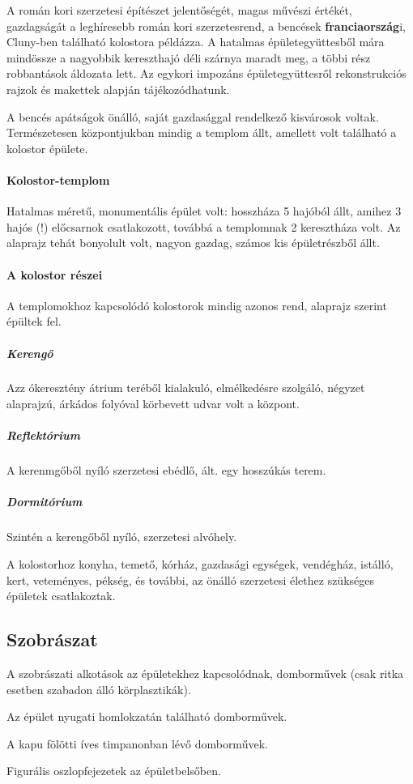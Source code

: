	A román kori szerzetesi építészet jelentőségét, magas művészi értékét, gazdagságát a leghíresebb román kori szerzetesrend, a bencések \textbf{franciaország}i, Cluny-ben található kolostora példázza. A hatalmas épületegyüttesből mára mindössze a nagyobbik kereszthajó déli szárnya maradt meg, a többi rész robbantások áldozata lett. Az egykori impozáns épületegyüttesről rekonstrukciós rajzok és makettek alapján tájékozódhatunk.
	
	A bencés apátságok önálló, saját gazdasággal rendelkező kisvárosok voltak. Természetesen központjukban mindig a templom állt, amellett volt található a kolostor épülete.
	
	\paragraph{Kolostor-templom}
	Hatalmas méretű, monumentális épület volt: hosszháza 5 hajóból állt, amihez 3 hajós (!) előcsarnok csatlakozott, továbbá a templomnak 2 keresztháza volt. Az alaprajz tehát bonyolult volt, nagyon gazdag, számos kis épületrészből állt.
	
	\paragraph{A kolostor részei}
	A templomokhoz kapcsolódó kolostorok mindig azonos rend, alaprajz szerint épültek fel.
		
		\subparagraph{Kerengő}
		Azz ókeresztény átrium teréből kialakuló, elmélkedésre szolgáló, négyzet alaprajzú, árkádos folyóval körbevett udvar volt a központ.
		
		\subparagraph{Reflektórium}
		A kerenmgőből nyíló szerzetesi ebédlő, ált. egy hosszúkás terem.
		
		\subparagraph{Dormitórium}
		Szintén a kerengőből nyíló, szerzetesi alvóhely.
		
	A kolostorhoz konyha, temető, kórház, gazdasági egységek, vendégház, istálló, kert, veteményes, pékség, és további, az önálló szerzetesi élethez szükséges épületek csatlakoztak.
	
	\subsection*{Szobrászat}
	
		A szobrászati alkotások az épületekhez kapcsolódnak, domborművek (csak ritka esetben szabadon álló körplasztikák).
		\begin{compactitem}
			\item Az épület nyugati homlokzatán található domborművek.
			\item A kapu fölötti íves timpanonban lévő domborművek.
			\item Figurális oszlopfejezetek az épületbelsőben.
		\end{compactitem}
	
